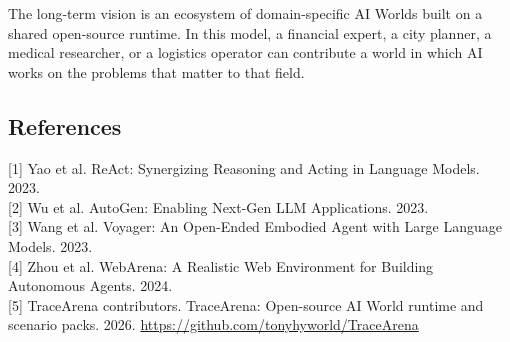 \documentclass[
]{article}
\begin{document}
The long-term vision is an ecosystem of domain-specific AI Worlds built
on a shared open-source runtime. In this model, a financial expert, a
city planner, a medical researcher, or a logistics operator can
contribute a world in which AI works on the problems that matter to that
field.

\subsection{References}\label{references}

{[}1{]} Yao et al. ReAct: Synergizing Reasoning and Acting in Language
Models. 2023.\\
{[}2{]} Wu et al. AutoGen: Enabling Next-Gen LLM Applications. 2023.\\
{[}3{]} Wang et al. Voyager: An Open-Ended Embodied Agent with Large
Language Models. 2023.\\
{[}4{]} Zhou et al. WebArena: A Realistic Web Environment for Building
Autonomous Agents. 2024.\\
{[}5{]} TraceArena contributors. TraceArena: Open-source AI World
runtime and scenario packs. 2026.
\url{https://github.com/tonyhyworld/TraceArena}
\end{document}
